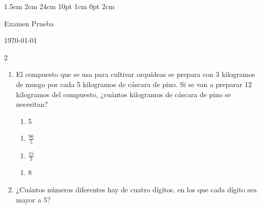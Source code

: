 \documentclass[10.5pt,letterpaper]{article}
\begin{document}
\setmargins{2.5cm}      
{1.5cm}                     
{2cm}  
{24cm}                    
{10pt}                          
{1cm}                          
{0pt}                             
{2cm}
\begin{flushleft}
Examen Prueba
\end{flushleft}
\vspace{-1.1cm}
\begin{flushright}
\today
\end{flushright}
\begin{multicols}{2}
\begin{enumerate}
\item El compuesto que se usa para cultivar orquídeas se prepara con 3 kilogramos de musgo por cada 5 kilogramos de cáscara de pino. Si se van a preparar 12 kilogramos del compuesto, ¿cuántos kilogramos de cáscara de pino se necesitan?\\

\begin{minipage}{0.23\linewidth}
\begin{enumerate}
\item[a)] 5
\end{enumerate}
\end{minipage}
\begin{minipage}{0.23\linewidth}
\begin{enumerate}
\item[b)] $\frac{96}{5}$
\end{enumerate}
\end{minipage}
\begin{minipage}{0.23\linewidth}
\begin{enumerate}
\item[c)] $\frac{15}{2}$
\end{enumerate}
\end{minipage}
\begin{minipage}{0.22\linewidth}
\begin{enumerate}
\item[d)] 8
\end{enumerate}
\end{minipage}
\item ¿Cuántos números diferentes hay de cuatro dígitos, en los que cada dígito sea mayor a 5?\\


\end{enumerate}
\end{multicols}
\end{document}
